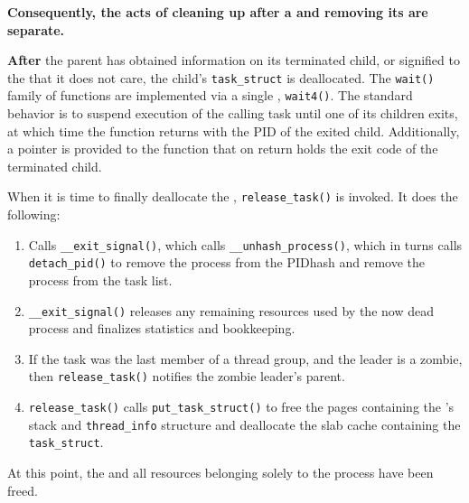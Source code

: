 \begin{center}
  \large{\textbf{Consequently, the acts of cleaning up after a  and removing its  are separate.}}
\end{center}

\textbf{After} the parent has obtained information on its terminated child, or signified to the  that it does not care, the child’s \texttt{task_struct} is deallocated.
The \texttt{wait()} family of functions are implemented via a single , \texttt{wait4()}.
The standard behavior is to suspend execution of the calling task until one of its children exits, at which time the function returns with the PID of the exited child.
Additionally, a pointer is provided to the function that on return holds the exit code of the terminated child.

When it is time to finally deallocate the , \texttt{release_task()} is invoked.
It does the following:
\begin{enumerate}
\item Calls \texttt{__exit_signal()}, which calls \texttt{__unhash_process()}, which in turns calls \texttt{detach_pid()} to remove the process from the PIDhash and remove the process from the task list.
\item \texttt{__exit_signal()} releases any remaining resources used by the now dead process and finalizes statistics and bookkeeping.
\item If the task was the last member of a thread group, and the leader is a zombie, then \texttt{release_task()} notifies the zombie leader’s parent.
\item \texttt{release_task()} calls \texttt{put_task_struct()} to free the pages containing the ’s  stack and \texttt{thread_info} structure and deallocate the slab cache containing the \texttt{task_struct}.
\end{enumerate}

At this point, the  and all resources belonging solely to the process
have been freed.


